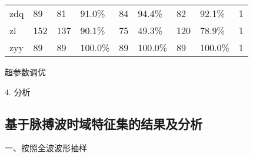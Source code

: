 \begin{landscape}
\begin{longtable}{m{2cm}<{\centering}m{2cm}<{\centering}m{2cm}<{\centering}m{2cm}<{\centering}m{2cm}<{\centering}m{2cm}<{\centering}m{2cm}<{\centering}m{2cm}<{\centering}m{2cm}<{\centering}}
            zdq                   & 89                    & 81         & 91.0\%     & 84         & 94.4\%     & 82         & 92.1\%      & 1                                                                      \\
            zl                    & 152                   & 137        & 90.1\%     & 75         & 49.3\%     & 120        & 78.9\%      & 1                                                                      \\
            zyy                   & 89                    & 89         & 100.0\%    & 89         & 100.0\%    & 89         & 100.0\%     & 1                                                                       \\    
\end{longtable}
\end{landscape}

超参数调优

4. 分析




\subsection{基于脉搏波时域特征集的结果及分析}

一、按照全波波形抽样

